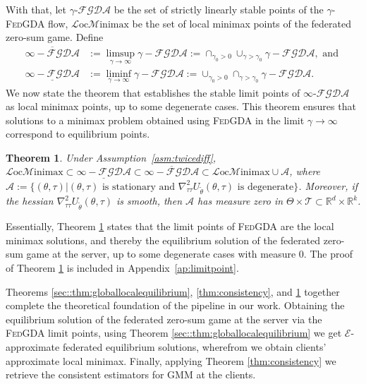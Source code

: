 \documentclass{article}
\def\gA{{\mathcal{A}}}
\def\gD{{\mathcal{D}}}
\def\gF{{\mathcal{F}}}
\def\gG{{\mathcal{G}}}
\def\gM{{\mathcal{M}}}
\def\gT{{\mathcal{T}}}
\newcommand{\fgda}{\textsc{FedGDA}\xspace}
\newtheorem{theorem}{Theorem}%
\theoremstyle{definition}
\begin{document}
With that, let $\gamma$-$\gF\gG\gD\gA$ be the set of strictly linearly stable points of the $\gamma$-\fgda flow, $\mathcal{L}\text{oc}\gM\text{inimax}$ be the set of local minimax points of the federated zero-sum game. Define 
\begin{align*}
	\overline{\infty-\mathcal{FGDA}}&:=\limsup_{\gamma\rightarrow\infty}\gamma-\mathcal{FGDA}:=\cap_{\gamma_0>0}\cup_{\gamma>\gamma_0}\gamma-\mathcal{FGDA}, \text{ and }\\
	\underline{\infty-\mathcal{FGDA}}&:=\liminf_{\gamma\rightarrow\infty}\gamma-\mathcal{FGDA}:=\cup_{\gamma_0>0}\cap_{\gamma>\gamma_0}\gamma-\mathcal{FGDA}.
\end{align*}
We now state the theorem that establishes the stable limit points of $\infty$-$\mathcal{FGDA}$ as local minimax points, up to some degenerate cases. This theorem ensures that solutions to a minimax problem obtained using \fgda in the limit $\gamma\rightarrow\infty$ correspond to equilibrium points.

 \begin{theorem}
 \label{thm:inftyfgda}
     Under Assumption~\ref{asm:twicediff}, $\mathcal{L}\text{oc}\gM\text{inimax}\subset\underline{\infty-\mathcal{FGDA}}\subset\overline{\infty-\mathcal{FGDA}}\subset\mathcal{L}\text{oc}\gM\text{inimax}\cup\gA$, where $\gA:=\{(\theta,\tau)|(\theta,\tau)\text{ is stationary and }\nabla_{\tau\tau}^2U_{\tilde\theta}(\theta, \tau)\text{ is degenerate}\}$. Moreover, if the hessian $\nabla_{\tau\tau}^2 U_{\tilde\theta}(\theta, \tau)$ is smooth, then $\gA$ has measure zero in $\Theta\times\gT\subset\mathbb{R}^{d} \times \mathbb{R}^k$.
 \end{theorem}
Essentially, Theorem \ref{thm:inftyfgda} states that the limit points of \fgda are the local minimax solutions, and thereby the equilibrium solution of the federated zero-sum game at the server, up to some degenerate cases with measure 0. The proof of Theorem \ref{thm:inftyfgda} is included in Appendix~\ref{ap:limitpoint}.

Theorems \ref{sec::thm:globallocalequilibrium}, \ref{thm:consistency}, and \ref{thm:inftyfgda} together complete the theoretical foundation of the pipeline in our work. Obtaining the equilibrium solution of the federated zero-sum game at the server via the \fgda limit points, using Theorem \ref{sec::thm:globallocalequilibrium} we get $\mathcal{E}$-approximate federated equilibrium solutions, wherefrom we obtain clients' approximate local minimax. Finally, applying Theorem \ref{thm:consistency} we retrieve the consistent estimators for GMM at the clients.
\end{document}

